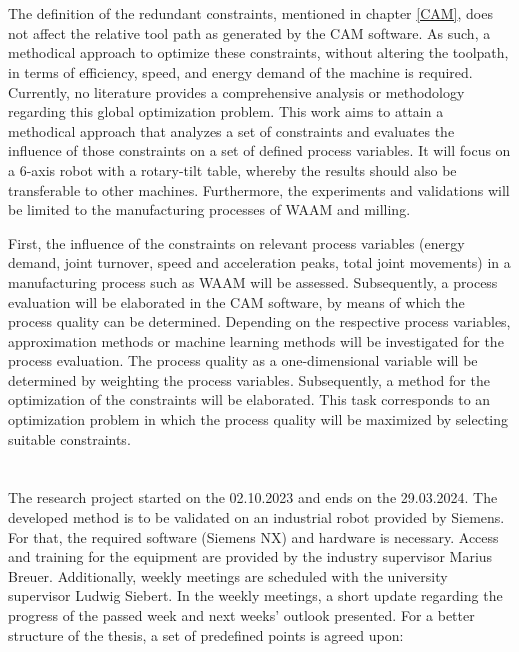 \documentclass[ZLstudentexpose%
              ,optBiber%
              ,optEnglish%
              ,10pt
              ]{ZLlatex}%
\begin{document}
\newpage
\section{}%
The definition of the redundant constraints, mentioned in chapter \ref{CAM}, does not affect the relative tool path as generated by the CAM software. As such, a methodical approach to optimize these constraints, without altering the toolpath, in terms of efficiency, speed, and energy demand of the machine is required. Currently, no literature provides a comprehensive analysis or methodology regarding this global optimization problem.
This work aims to attain a methodical approach that analyzes a set of constraints and evaluates the influence of those constraints on a set of defined process variables. It will focus on a 6-axis robot with a rotary-tilt table, whereby the results should also be transferable to other machines. Furthermore, the experiments and validations will be limited to the manufacturing processes of WAAM and milling. 


First, the influence of the constraints on relevant process variables (energy demand, joint turnover, speed and acceleration peaks, total joint movements) in a manufacturing process such as WAAM will be assessed. Subsequently, a process evaluation will be elaborated in the CAM software, by means of which the process quality can be determined. Depending on the respective process variables, approximation methods or machine learning methods will be investigated for the process evaluation. The process quality as a one-dimensional variable will be determined by weighting the process variables. Subsequently, a method for the optimization of the constraints will be elaborated. This task corresponds to an optimization problem in which the process quality will be maximized by selecting suitable constraints. 


\section{}%
The research project started on the 02.10.2023 and ends on the 29.03.2024. The developed method is to be validated on an industrial robot provided by Siemens. For that, the required software (Siemens NX) and hardware is necessary. Access and training for the equipment are provided by the industry supervisor Marius Breuer. 
Additionally, weekly meetings are scheduled with the university supervisor Ludwig Siebert. In the weekly meetings, a short update regarding the progress of the passed week and next weeks' outlook presented. \newline
For a better structure of the thesis, a set of predefined points is agreed upon:
\end{document}
